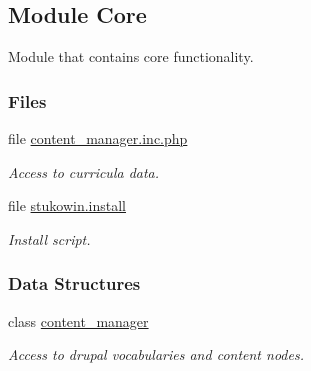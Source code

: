 \hypertarget{group___stukowin___module}{\subsection{Module Core}
\label{group___stukowin___module}
}


Module that contains core functionality.  


\subsubsection*{Files}
\begin{DoxyCompactItemize}
\item 
file \hyperlink{content__manager_8inc_8php}{content\+\_\+manager.\+inc.\+php}
\begin{DoxyCompactList}\small\item\em Access to curricula data. \end{DoxyCompactList}\item 
file \hyperlink{stukowin_8install}{stukowin.\+install}
\begin{DoxyCompactList}\small\item\em Install script. \end{DoxyCompactList}\end{DoxyCompactItemize}
\subsubsection*{Data Structures}
\begin{DoxyCompactItemize}
\item 
class \hyperlink{classcontent__manager}{content\+\_\+manager}
\begin{DoxyCompactList}\small\item\em Access to drupal vocabularies and content nodes. \end{DoxyCompactList}\end{DoxyCompactItemize}
